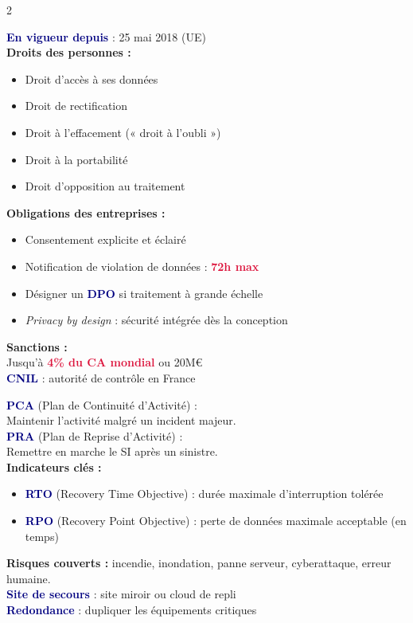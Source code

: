 \documentclass[a4paper,10pt]{article}
\newcommand{\key}[1]{\textbf{\textcolor{navy}{#1}}}
\newcommand{\warn}[1]{\textbf{\textcolor{crimson}{#1}}}
\begin{document}
\begin{multicols}{2}
\begin{tcolorbox}[basebox, colframe=orange, title=5. RGPD — Règlement Général Protection Données]
\key{En vigueur depuis} : 25 mai 2018 (UE)\\[4pt]
\textbf{Droits des personnes :}
\begin{itemize}
  \item Droit d'accès à ses données
  \item Droit de rectification
  \item Droit à l'effacement (« droit à l'oubli »)
  \item Droit à la portabilité
  \item Droit d'opposition au traitement
\end{itemize}
\vspace{4pt}
\textbf{Obligations des entreprises :}
\begin{itemize}
  \item Consentement explicite et éclairé
  \item Notification de violation de données : \warn{72h max}
  \item Désigner un \key{DPO} si traitement à grande échelle
  \item \textit{Privacy by design} : sécurité intégrée dès la conception
\end{itemize}
\vspace{4pt}
\textbf{Sanctions :}\\
Jusqu'à \warn{4\% du CA mondial} ou 20M€ \\
\key{CNIL} : autorité de contrôle en France
\end{tcolorbox}

\begin{tcolorbox}[basebox, colframe=purple, title=6. PCA / PRA — Continuité et reprise]
\key{PCA} (Plan de Continuité d'Activité) :\\
Maintenir l'activité malgré un incident majeur.\\[4pt]
\key{PRA} (Plan de Reprise d'Activité) :\\
Remettre en marche le SI après un sinistre.\\[4pt]
\textbf{Indicateurs clés :}
\begin{itemize}
  \item \key{RTO} (Recovery Time Objective) : durée maximale d'interruption tolérée
  \item \key{RPO} (Recovery Point Objective) : perte de données maximale acceptable (en temps)
\end{itemize}
\vspace{4pt}
\textbf{Risques couverts :} incendie, inondation, panne serveur, cyberattaque, erreur humaine.\\[4pt]
\key{Site de secours} : site miroir ou cloud de repli\\
\key{Redondance} : dupliquer les équipements critiques
\end{tcolorbox}


\end{multicols}
\end{document}
